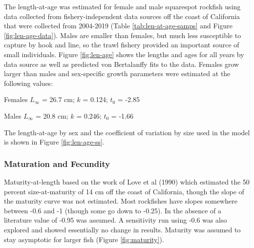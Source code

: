 \documentclass[11pt,
  english,
  a4paper,
]{article}
\begin{document}
\leavevmode\tagmcend\tagstructend


The length-at-age was estimated for female and male squarespot rockfish using data collected from fishery-independent data sources off the coast of California that were collected from 2004-2019 (Table \ref{tab:len-at-age-samps} and Figure \ref{fig:len-age-data}). Males are smaller than females, but much less susceptible to capture by hook and line, so the trawl fishery provided an important source of small individuals. Figure \ref{fig:len-age} shows the lengths and ages for all years by data source as well as predicted von Bertalanffy fits to the data. Females grow larger than males and sex-specific growth parameters were estimated at the following values:

\leavevmode\tagmcend\tagstructend\par

\begin{centering}

Females $L_{\infty}$ = 26.7 cm; $k$ = 0.124; $t_0$ = -2.85

Males $L_{\infty}$ = 20.8 cm; $k$ = 0.246; $t_0$ = -1.66

\end{centering}

\vspace{0.5cm}


The length-at-age by sex and the coefficient of variation by size used in the model is shown in Figure \ref{fig:len-age-ss}.

\leavevmode\tagmcend\tagstructend\par


\hypertarget{maturation-and-fecundity}{%
\subsubsection{Maturation and Fecundity}\label{maturation-and-fecundity}}

\leavevmode\tagmcend\tagstructend


Maturity-at-length based on the work of Love et al {(1990)\leavevmode\tagmcend\tagstructend} which estimated the 50 percent size-at-maturity of 14 cm off the coast of California, though the slope of the maturity curve was not estimated. Most rockfishes have slopes somewhere between -0.6 and -1 (though some go down to -0.25). In the absence of a literature value of -0.95 was assumed. A sensitivity run using -0.6 was also explored and showed essentially no change in results. Maturity was assumed to stay asymptotic for larger fish (Figure \ref{fig:maturity}).
\end{document}
